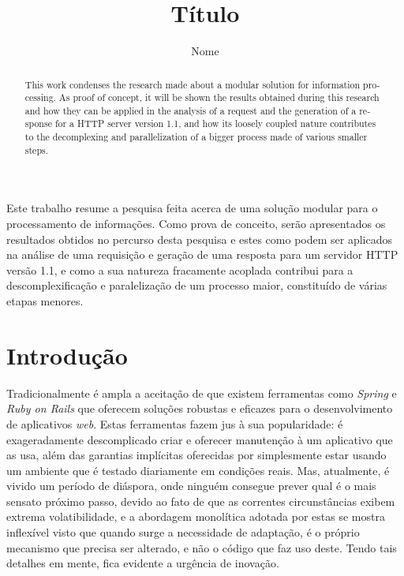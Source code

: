 \documentclass[12pt]{article}
\title{Título}
\author{Nome\inst{1}}
\begin{document}
  \maketitle
  
  \begin{resumo} 
    Este trabalho resume a pesquisa feita acerca de uma solução modular para o processamento de informações. Como prova de conceito, serão apresentados os resultados obtidos no percurso desta pesquisa e estes como podem ser aplicados na análise de uma requisição e geração de uma resposta para um servidor HTTP versão 1.1, e como a sua natureza fracamente acoplada contribui para a descomplexificação e paralelização de um processo maior, constituído de várias etapas menores.
  \end{resumo}

  \begin{abstract}
    \begin{otherlanguage}{english}
      This work condenses the research made about a modular solution for information processing. As proof of concept, it will be shown the results obtained during this research and how they can be applied in the analysis of a request and the generation of a response for a HTTP server version 1.1, and how its loosely coupled nature contributes to the decomplexing and parallelization of a bigger process made of various smaller steps.
    \end{otherlanguage}
  \end{abstract}
  
  \section{Introdução}
  
  Tradicionalmente é ampla a aceitação de que existem ferramentas como \textit{Spring} e \textit{Ruby on Rails} que oferecem soluções robustas e eficazes para o desenvolvimento de aplicativos \textit{web}. Estas ferramentas fazem jus à sua popularidade: é exageradamente descomplicado criar e oferecer manutenção à um aplicativo que as usa, além das garantias implícitas oferecidas por simplesmente estar usando um ambiente que é testado diariamente em condições reais. Mas, atualmente, é vivido um período de diáspora, onde ninguém consegue prever qual é o mais sensato próximo passo, devido ao fato de que as correntes circunstâncias exibem extrema volatibilidade, e a abordagem monolítica adotada por estas se mostra inflexível visto que quando surge a necessidade de adaptação, é o próprio mecanismo que precisa ser alterado, e não o código que faz uso deste. Tendo tais detalhes em mente, fica evidente a urgência de inovação.
  
\end{document}
